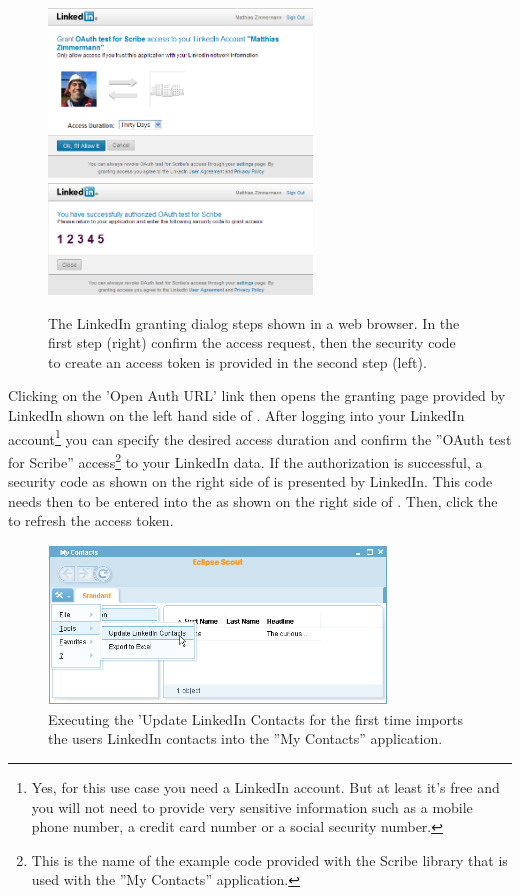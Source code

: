 \documentclass[a4paper,10pt,twoside]{book}
\begin{document}
\begin{figure}
\includegraphics[width=7cm]{oauth_grant_access.png} \hspace{5mm}
\includegraphics[width=7cm]{oauth_security_code.png} 
\caption{The LinkedIn granting dialog steps shown in a web browser. 
In the first step (right) confirm the access request, then the security code to create an access token is provided in the second step (left).
}
\end{figure}

Clicking on the 'Open Auth URL' link then opens the granting page provided by LinkedIn shown on the left hand side of . 
After logging into your LinkedIn account\footnote{
Yes, for this use case you need a LinkedIn account. But at least it's free and you will not need to provide very sensitive information such as a mobile phone number, a credit card number or a social security number. 
}
you can specify the desired access duration and confirm the ''OAuth test for Scribe'' access\footnote{
This is the name of the example code provided with the Scribe library that is used with the ''My Contacts'' application. 
} 
to your LinkedIn data.
If the authorization is successful, a security code as shown on the right side of  is presented by LinkedIn. 
This code needs then to be entered into the  as shown on the right side of . 
Then, click the  to refresh the access token. 

\begin{figure}
\includegraphics[width=9cm]{my_contacts_rayo_updatecontacts.png} \hspace{5mm}
\caption{Executing the 'Update LinkedIn Contacts for the first time imports the users LinkedIn contacts into the ''My Contacts'' application.}
\end{figure}
\end{document}
